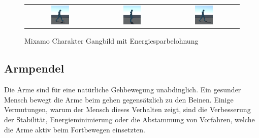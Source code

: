 \begin{figure}[H]
\begin{tabular}{ccc}
    \includegraphics[width=0.27\textwidth]{img/charakter_mixamo_laufen_energiespar4}  & \includegraphics[width=0.27\textwidth]{img/charakter_mixamo_laufen_energiespar5}  & \includegraphics[width=0.27\textwidth]{img/charakter_mixamo_laufen_energiespar6} \\
  \end{tabular}
  \caption{Mixamo Charakter Gangbild mit Energiesparbelohnung}
  \label{fig:mixamo_versuch12_gangbild}
\end{figure}

\subsection{Armpendel}
Die Arme sind für eine natürliche Gehbewegung unabdinglich. Ein gesunder Mensch bewegt die Arme beim gehen gegensätzlich zu den Beinen. Einige Vermutungen, warum der Mensch dieses Verhalten zeigt, sind die Verbesserung der Stabilität, Energieminimierung oder die Abstammung von Vorfahren, welche die Arme aktiv beim Fortbewegen einsetzten.\cite{meyns2013and}

